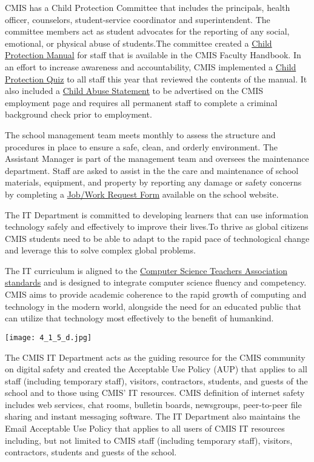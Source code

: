 \begin{findings}
CMIS has a Child Protection Committee that includes the principals, health officer, counselors, student-service coordinator and superintendent. The committee members act as student advocates for the reporting of any social, emotional, or physical abuse of students.The committee created a \href{https://docs.google.com/a/cmis.ac.th/document/d/1NtJ-Yz1ra-dug9r6BmMGqTD3tE9TFxx5W1QhBzPYlxI/edit?usp=sharing}{Child Protection Manual} for staff that is available in the CMIS Faculty Handbook. In an effort to increase awareness and accountability, CMIS implemented a \href{https://docs.google.com/a/cmis.ac.th/forms/d/185Ul5UTdsOSC8btz8CWdIvklNYs6WdPdnzb7gUrOYyM/edit}{Child Protection Quiz} to all staff this year that reviewed the contents of the manual. It also included a \href{http://cmis.ac.th/about/employment}{Child Abuse Statement} to be advertised on the CMIS employment page and requires all permanent staff to complete a criminal background check prior to employment.

The school management team meets monthly to assess the structure and procedures in place to ensure a safe, clean, and orderly environment. The Assistant Manager is part of the management team and oversees the maintenance department. Staff are asked to assist in the the care and maintenance of school materials, equipment, and property by reporting any damage or safety concerns by completing a \href{https://docs.google.com/a/cmis.ac.th/forms/d/e/1FAIpQLSe3YhMowLuZm-HuEG2v_6M2HYfOmQJ5tQG5gB2nEAksooUQNA/viewform}{Job/Work Request Form} available on the school website.

The IT Department is committed to developing learners that can use information technology safely and effectively to improve their lives.To thrive as global citizens CMIS students need to be able to adapt to the rapid pace of technological change and leverage this to solve complex global problems.

The IT curriculum is aligned to the \href{https://www.csteachers.org/}{Computer Science Teachers Association standards} and is designed to integrate computer science fluency and competency. CMIS  aims to provide academic coherence to the rapid growth of computing and technology in the modern world, alongside the need for an educated public that can utilize that technology most effectively to the benefit of humankind.

{\centering\texttt{[image: 4\_1\_5\_d.jpg]}}

The CMIS IT Department acts as the guiding resource for the CMIS community on digital safety and created the Acceptable Use Policy (AUP) that applies to all staff (including temporary staff), visitors, contractors, students, and guests of the school and to those using CMIS' IT resources.  CMIS definition of internet safety includes web services, chat rooms, bulletin boards, newsgroups, peer-to-peer file sharing and instant messaging software.  The IT Department also maintains the Email Acceptable Use Policy that applies to all users of CMIS IT resources including, but not limited to CMIS staff (including temporary staff), visitors, contractors, students and guests of the school.  


\end{findings}
